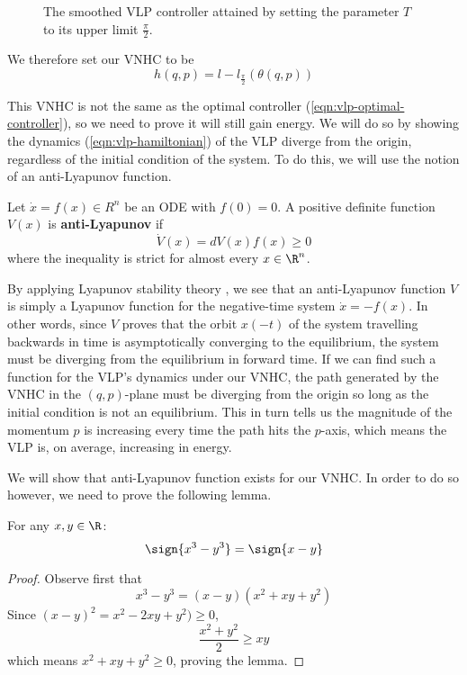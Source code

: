 \begin{figure}
   \centering
   \caption{The smoothed VLP controller attained by setting the parameter 
      \(T\) to its upper limit
   \(\frac{\pi}{2}\).}\label{fig:vlp-smoothed-controller}
\end{figure}

We therefore set our VNHC to be
\[
   h(q,p) = l - l_\frac{\pi}{2}\left(\theta(q,p)\right)
\]

This VNHC is not the same as the optimal controller
(\ref{eqn:vlp-optimal-controller}), so we need to prove it will still gain
energy. We will do so by showing the dynamics (\ref{eqn:vlp-hamiltonian}) of the
VLP diverge from the origin, regardless of the initial condition of the system. 
To do this, we will use the notion of an anti-Lyapunov function.

\begin{defn}\label{defn:anti-lyapunov}
   Let \(\dot{x} = f(x) \in R^n\) be an ODE with \(f(0) = 0\). 
   A positive definite function \(V(x)\) is \textbf{anti-Lyapunov} if 
   \[
      \dot{V}(x) = dV(x) f(x) \geq 0
   \]
   where the inequality is strict for almost every \(x \in \R^n\).
\end{defn}

By applying Lyapunov stability theory \cite{lyapunov},
we see that an anti-Lyapunov function
\(V\) is simply a Lyapunov function for the negative-time system 
\(\dot{x} = -f(x)\). In other words, since \(V\) proves that the orbit \(x(-t)\) 
of the system travelling backwards in time is asymptotically converging to the
equilibrium, the system must be diverging from the equilibrium in forward time.
If we can find such a function for the VLP's dynamics under our VNHC, the path
generated by the VNHC in the \((q,p)\)-plane must be diverging from the origin
so long as the initial condition is not an equilibrium.
This in turn tells us the magnitude of the momentum \(p\) is increasing every
time the path hits the \(p\)-axis, which means the VLP is, on average,
increasing in energy.

We will show that anti-Lyapunov function exists for our VNHC.
In order to do so however, we need to prove the following lemma.

\begin{lemma}\label{lemma:sign-of-cube}
   For any \(x,y \in \R\):
   \[
      \sign{x^3 - y^3} = \sign{x-y}
   \]
\end{lemma}
\begin{proof}
   Observe first that
   \[
      x^3 - y^3 =  (x-y)(x^2 + xy + y^2)
   \]
   Since \( (x-y)^2 = x^2 - 2xy + y^2) \geq 0 \), 
   \[
      \frac{x^2 + y^2}{2} \geq xy
   \]
   which means \(x^2 + xy + y^2 \geq 0\), proving the lemma.
\end{proof}

